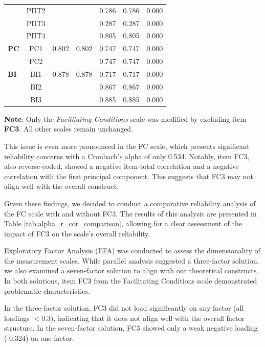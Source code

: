\documentclass[twocolumn]{article}
\begin{document}
\begin{table}[ht!]
{\begin{tabular}{lcccccc}
                                           & PIIT2 &      &      & 0.786 & 0.786 & 0.000 \\
                                           & PIIT3 &      &      & 0.287 & 0.287 & 0.000 \\
                                           & PIIT4 &      &      & 0.805 & 0.805 & 0.000 \\
\midrule
\textbf{PC} & PC1 & 0.802 & 0.802 & 0.747 & 0.747 & 0.000 \\
                               & PC2 &      &      & 0.747 & 0.747 & 0.000 \\
\midrule
\textbf{BI} & BI1 & 0.878 & 0.878 & 0.717 & 0.717 & 0.000 \\
                                  & BI2 &      &      & 0.867 & 0.867 & 0.000 \\
                                  & BI3 &      &      & 0.885 & 0.885 & 0.000 \\
\bottomrule
\end{tabular}%
}
\smallskip
\begin{flushleft}
\footnotesize \textbf{Note}: Only the \textit{Facilitating Conditions} scale was modified by excluding item \textbf{FC3}. All other scales remain unchanged.
\end{flushleft}
\end{table}


This issue is even more pronounced in the FC scale, which presents significant reliability concerns with a Cronbach's alpha of only 0.534. Notably, item FC3, also reverse-coded, showed a negative item-total correlation and a negative correlation with the first principal component. This suggests that FC3 may not align well with the overall construct.

Given these findings, we decided to conduct a comparative reliability analysis of the FC scale with and without FC3. The results of this analysis are presented in Table \ref{tab:alpha_r_cor_comparison}, allowing for a clear assessment of the impact of FC3 on the scale's overall reliability. 

Exploratory Factor Analysis (EFA) was conducted to assess the dimensionality of the measurement scales. While parallel analysis suggested a three-factor solution, we also examined a seven-factor solution to align with our theoretical constructs. In both solutions, item FC3 from the Facilitating Conditions scale demonstrated problematic characteristics.

In the three-factor solution, FC3 did not load significantly on any factor (all loadings $< 0.3$), indicating that it does not align well with the overall factor structure. In the seven-factor solution, FC3 showed only a weak negative loading (-0.324) on one factor.
\end{document}
